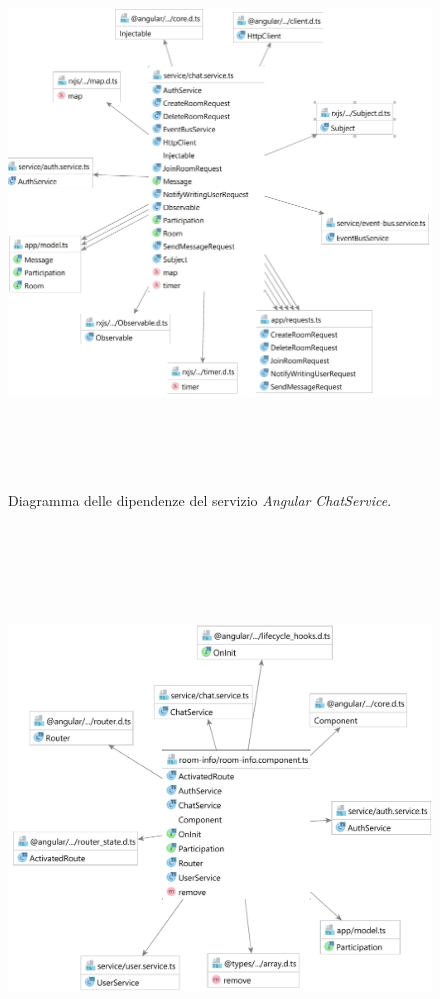 \begin{itemize}
\begin{figure}
        \includegraphics[height=15cm, width=12cm, keepaspectratio]{images/chat-service-dependencies.PNG}
        \caption{Diagramma delle dipendenze del servizio \textit{Angular} \textit{ChatService}.}
        \label{fig:angular-chat-service-dependencies-diagram}
    \end{figure}
    \begin{figure}
        \centering
        \includegraphics[height=15cm, width=12cm, keepaspectratio]{images/room-info-component-dependencies.png}

\end{figure}
\end{itemize}
